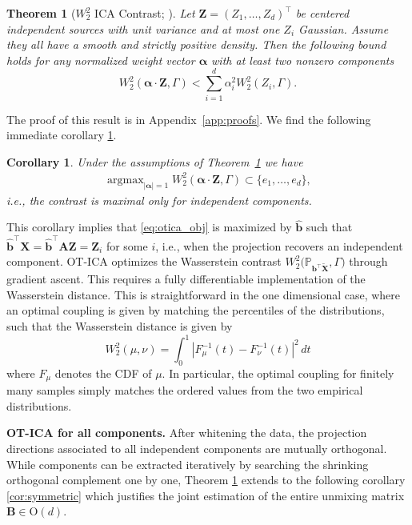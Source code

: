 \documentclass[accepted]{tpm2026} %
\newtheorem{theorem}{Theorem}
\newtheorem{corollary}{Corollary}
\newcommand{\Xb}{\mathbf{X}}
\newcommand{\Ab}{\mathbf{A}}
\newcommand{\Zb}{\mathbf{Z}}
\newcommand{\bb}{\mathbf{b}}
\newcommand{\alphab}{\mathbf{\alpha}}
\begin{document}
\begin{theorem}[$W_2^2$ ICA Contrast; \citealt{johnson2005central}]\label{th:main}
Let $\mathbf{Z} = (Z_1, \dots, Z_d)^\top$ be centered independent sources with unit variance and at most one $Z_i$ Gaussian. Assume they all have a smooth and strictly positive density. Then the following bound holds for  any normalized weight vector $\mathbf{\alpha}$ with at least two nonzero components
\begin{equation}
    W_2^2(\mathbf{\alpha} \cdot \mathbf{Z}, \Gamma) < \sum_{i=1}^d \alpha_i^2 W_2^2(Z_i, \Gamma).
\end{equation}
\end{theorem}
The proof of this result is in Appendix~\ref{app:proofs}.
We find the following immediate corollary \ref{cor:max_contrast}.
\begin{corollary}\label{cor:max_contrast}
    Under the assumptions of Theorem~\ref{th:main}
    we have
    \begin{align}
        \operatorname{argmax}_{|\alphab|=1}W_2^2(\mathbf{\alpha} \cdot \mathbf{Z}, \Gamma)
        \subset \{e_1,\ldots, e_d\},
    \end{align}
    i.e., the contrast is maximal only for  independent components.
\end{corollary}
This corollary implies that
\eqref{eq:otica_obj} is maximized by $\widehat{\bb}$ such that
$\widehat{\bb}^\top \Xb=\widehat{\bb}^\top \Ab\Zb=\Zb_i$ for some $i$, i.e., when the projection recovers an independent component.
OT-ICA optimizes the Wasserstein contrast
$W_2^2\big(\mathbb{P}_{\mathbf{b}^\top \widetilde{\mathbf{X}}}, \Gamma\big)$ through gradient ascent. 
This requires a fully differentiable implementation of the Wasserstein distance. This is straightforward in the one dimensional case, where an optimal coupling is given by matching the percentiles of the distributions, such that the Wasserstein distance is given by
\begin{equation}
    W_2^2(\mu, \nu) = \int_0^1 |F_\mu^{-1}(t) - F_\nu^{-1}(t)|^2 \, dt
\end{equation}
where $F_\mu$ denotes the CDF of $\mu$. In particular, the optimal coupling for finitely many samples simply matches the ordered values from the two empirical distributions.



\textbf{OT-ICA for all components.}
After whitening the data, the projection directions associated to all independent components are mutually orthogonal. While components can be extracted iteratively by searching the shrinking orthogonal complement one by one, Theorem \ref{th:main} extends to the following corollary \ref{cor:symmetric} which justifies the joint estimation of the entire unmixing matrix $\mathbf{B} \in \mathrm{O}(d)$.
\end{document}
